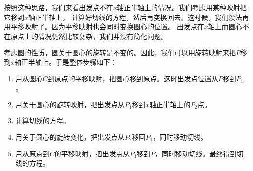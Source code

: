 \documentclass[12pt,UTF8]{ctexbook}
\begin{document}
按照这种思路，我们来看出发点不在$x$轴正半轴上的情况。我们考虑用某种映射把它移到$x$轴正半轴上，
计算好切线的方程，然后再变换回去。这时候，我们没法再用平移映射了。因为平移映射也会同时变换圆心的位置。
出发点在$x$轴上而圆心不在原点上的情况仍然比较复杂，我们并没有简化问题。

考虑圆的性质，圆关于圆心的旋转是不变的。因此，我们可以用旋转映射来把$P$移到$x$轴正半轴上。于是整体步骤如下：

\begin{enumerate}
    \item 用从圆心$C$到原点的平移映射，把圆心移到原点。这时出发点位置从$P$移到$P_1$。
    \item 用关于圆心的旋转映射，把出发点从$P_1$移到$x$轴正半轴上的$P_2$点。
    \item 计算切线的方程。
    \item 用关于圆心的旋转变化，把出发点从$P_2$移回$P_1$，同时移动切线。
    \item 用从原点到$C$的平移映射，把出发点从$P_1$移到$P$，同时移动切线。最终得到切线的方程。
\end{enumerate}
\end{document}
